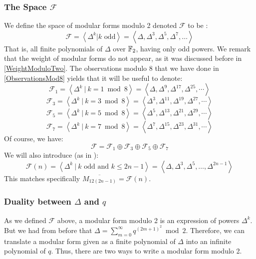 \subsubsection{The Space $\mathcal{F}$}
\label{ModularFormsModTwo}
We define the space of modular forms modulo 2 denoted $\mathcal{F} $ to be \cite[2.1]{OrdreNilpotenceOperateurHecke}:
$$
\mathcal{F}
= \left\langle \Delta^k | k \text{ odd} \right\rangle
= \left\langle \Delta, \Delta^3, \Delta^5, \Delta^7, \dots \right\rangle 
$$
That is, all finite polynomials of $\Delta$ over $\mathbb{F}_2$, having only odd powers.
We remark that the weight of modular forms do not appear, as it was discussed before in \ref{WeightModuloTwo}.
The observations modulo 8 that we have done in \ref{ObservationsMod8} yields that it will be useful to denote:
$$
\mathcal{F}_1
= \left\langle \Delta^k \ | \ k = 1 \bmod 8 \right\rangle
= \left\langle \Delta, \Delta^9, \Delta^{17}, \Delta^{25}, \cdots \right\rangle
$$
$$
\mathcal{F}_3
= \left\langle \Delta^k \ | \ k = 3 \bmod 8 \right\rangle
= \left\langle \Delta^3, \Delta^{11}, \Delta^{19}, \Delta^{27}, \cdots \right\rangle
$$
$$
\mathcal{F}_5
= \left\langle \Delta^k \ | \ k = 5 \bmod 8 \right\rangle
= \left\langle \Delta^5, \Delta^{13}, \Delta^{21}, \Delta^{29}, \cdots \right\rangle
$$
$$
\mathcal{F}_7
= \left\langle \Delta^k \ | \ k = 7 \bmod 8 \right\rangle
= \left\langle \Delta^7, \Delta^{15}, \Delta^{23}, \Delta^{31}, \cdots \right\rangle
$$
Of course, we have:
$$
\mathcal{F} = \mathcal{F}_1 \oplus \mathcal{F}_3 \oplus \mathcal{F}_5 \oplus \mathcal{F}_7
$$
We will also introduce (as in \cite[2.]{StructureAlgebreHecke}):
$$
\mathcal{F}(n)
= \left\langle \Delta^k \ | \ k \text{ odd} \text{ and } k \leq 2n-1 \right\rangle
= \left\langle \Delta, \Delta^3, \Delta^5, \dots, \Delta^{2n-1} \right\rangle
$$
This matches specifically $\overline{M_{12(2n-1)}} = \mathcal{F}(n)$.


\subsubsection{Duality between $\Delta$ and $q$}
As we defined $\mathcal{F}$ above, a modular form modulo 2 is an expression of powers $\Delta^k$.
But we had from before that $\Delta = \sum_{m=0}^{\infty} q^{(2m+1)^2} \bmod 2$.
Therefore, we can translate a modular form given as a finite polynomial of $\Delta$ into an infinite polynomial of $q$.
Thus, there are two ways to write a modular form modulo 2.

